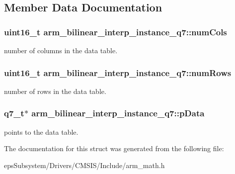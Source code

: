 \subsection{Member Data Documentation}
\hypertarget{structarm__bilinear__interp__instance__q7_a860dd0d24380ea06cfbb348fb3b12c9a}{
\subsubsection[{num\-Cols}]{\setlength{\rightskip}{0pt plus 5cm}uint16\-\_\-t arm\-\_\-bilinear\-\_\-interp\-\_\-instance\-\_\-q7\-::num\-Cols}}\label{structarm__bilinear__interp__instance__q7_a860dd0d24380ea06cfbb348fb3b12c9a}
number of columns in the data table. \hypertarget{structarm__bilinear__interp__instance__q7_ad5a8067cab5f9ea4688b11a623e16607}{
\subsubsection[{num\-Rows}]{\setlength{\rightskip}{0pt plus 5cm}uint16\-\_\-t arm\-\_\-bilinear\-\_\-interp\-\_\-instance\-\_\-q7\-::num\-Rows}}\label{structarm__bilinear__interp__instance__q7_ad5a8067cab5f9ea4688b11a623e16607}
number of rows in the data table. \hypertarget{structarm__bilinear__interp__instance__q7_af05194d691bbefb02c34bafb22ca9ef0}{
\subsubsection[{p\-Data}]{\setlength{\rightskip}{0pt plus 5cm}q7\-\_\-t$\ast$ arm\-\_\-bilinear\-\_\-interp\-\_\-instance\-\_\-q7\-::p\-Data}}\label{structarm__bilinear__interp__instance__q7_af05194d691bbefb02c34bafb22ca9ef0}
points to the data table. 

The documentation for this struct was generated from the following file\-:\begin{DoxyCompactItemize}
\item 
eps\-Subsystem/\-Drivers/\-C\-M\-S\-I\-S/\-Include/arm\-\_\-math.\-h\end{DoxyCompactItemize}
